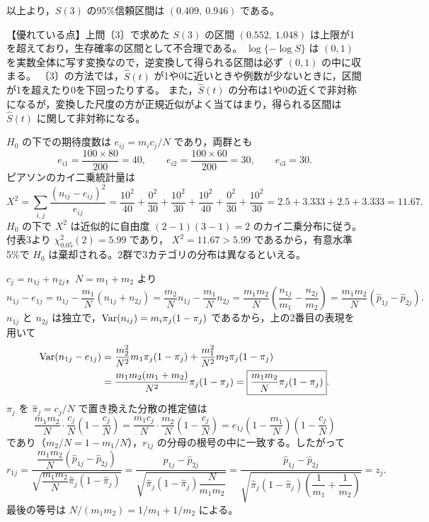 \documentclass[a4paper,11pt]{ltjsarticle}
\begin{document}
以上より，$S(3)$ の95\%信頼区間は $\boxed{(0.409,\ 0.946)}$ である。

【優れている点】上問〔3〕で求めた $S(3)$ の区間 $(0.552,\ 1.048)$ は上限が1を超えており，生存確率の区間として不合理である。
$\log\{-\log S\}$ は $(0,1)$ を実数全体に写す変換なので，逆変換して得られる区間は必ず $(0,1)$ の中に収まる。
〔3〕の方法では，$\hat S(t)$ が1や0に近いときや例数が少ないときに，区間が1を超えたり0を下回ったりする。
また，$\hat S(t)$ の分布は1や0の近くで非対称になるが，変換した尺度の方が正規近似がよく当てはまり，得られる区間は $\hat S(t)$ に関して非対称になる。
\newpage

$H_0$ の下での期待度数は $e_{ij}=m_ic_j/N$ であり，両群とも
\[
e_{i1}=\frac{100\times80}{200}=40,\qquad e_{i2}=\frac{100\times60}{200}=30,\qquad e_{i3}=30 .
\]
ピアソンのカイ二乗統計量は
\[
X^2=\sum_{i,j}\frac{(n_{ij}-e_{ij})^2}{e_{ij}}
=\frac{10^2}{40}+\frac{0^2}{30}+\frac{10^2}{30}+\frac{10^2}{40}+\frac{0^2}{30}+\frac{10^2}{30}
=2.5+3.333+2.5+3.333=\boxed{11.67}.
\]
$H_0$ の下で $X^2$ は近似的に自由度 $(2-1)(3-1)=2$ のカイ二乗分布に従う。付表3より $\chi^2_{0.05}(2)=5.99$ であり，
$X^2=11.67>5.99$ であるから，有意水準5\%で $H_0$ は棄却される。2群で3カテゴリの分布は異なるといえる。

$c_j=n_{1j}+n_{2j}$，$N=m_1+m_2$ より
\[
n_{1j}-e_{1j}=n_{1j}-\frac{m_1}{N}(n_{1j}+n_{2j})=\frac{m_2}{N}n_{1j}-\frac{m_1}{N}n_{2j}
=\frac{m_1m_2}{N}\left(\frac{n_{1j}}{m_1}-\frac{n_{2j}}{m_2}\right)=\frac{m_1m_2}{N}(\hat p_{1j}-\hat p_{2j}).
\]
$n_{1j}$ と $n_{2j}$ は独立で，$\operatorname{Var}(n_{ij})=m_i\pi_j(1-\pi_j)$ であるから，上の2番目の表現を用いて
\begin{align*}
\operatorname{Var}(n_{1j}-e_{1j})&=\frac{m_2^2}{N^2}m_1\pi_j(1-\pi_j)+\frac{m_1^2}{N^2}m_2\pi_j(1-\pi_j)\\
&=\frac{m_1m_2(m_1+m_2)}{N^2}\pi_j(1-\pi_j)=\boxed{\frac{m_1m_2}{N}\pi_j(1-\pi_j)}.
\end{align*}
$\pi_j$ を $\hat\pi_j=c_j/N$ で置き換えた分散の推定値は
\[
\frac{m_1m_2}{N}\cdot\frac{c_j}{N}\left(1-\frac{c_j}{N}\right)
=\frac{m_1c_j}{N}\cdot\frac{m_2}{N}\left(1-\frac{c_j}{N}\right)
=e_{1j}\left(1-\frac{m_1}{N}\right)\left(1-\frac{c_j}{N}\right)
\]
であり（$m_2/N=1-m_1/N$），$r_{1j}$ の分母の根号の中に一致する。したがって
\[
r_{1j}=\frac{\dfrac{m_1m_2}{N}(\hat p_{1j}-\hat p_{2j})}{\sqrt{\dfrac{m_1m_2}{N}\hat\pi_j(1-\hat\pi_j)}}
=\frac{\hat p_{1j}-\hat p_{2j}}{\sqrt{\hat\pi_j(1-\hat\pi_j)\dfrac{N}{m_1m_2}}}
=\frac{\hat p_{1j}-\hat p_{2j}}{\sqrt{\hat\pi_j(1-\hat\pi_j)\left(\dfrac1{m_1}+\dfrac1{m_2}\right)}}=z_j .
\]
最後の等号は $N/(m_1m_2)=1/m_1+1/m_2$ による。
\end{document}
